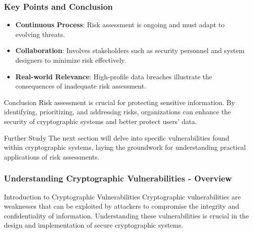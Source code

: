 \documentclass{beamer}
\begin{document}
\begin{frame}[fragile]
    \frametitle{Key Points and Conclusion}
    \begin{itemize}
        \item \textbf{Continuous Process}: Risk assessment is ongoing and must adapt to evolving threats.
        \item \textbf{Collaboration}: Involves stakeholders such as security personnel and system designers to minimize risk effectively.
        \item \textbf{Real-world Relevance}: High-profile data breaches illustrate the consequences of inadequate risk assessment.
    \end{itemize}
    
    \begin{block}{Conclusion}
        Risk assessment is crucial for protecting sensitive information. By identifying, prioritizing, and addressing risks, organizations can enhance the security of cryptographic systems and better protect users' data.
    \end{block}
    
    \begin{block}{Further Study}
        The next section will delve into specific vulnerabilities found within cryptographic systems, laying the groundwork for understanding practical applications of risk assessments.
    \end{block}
\end{frame}

\begin{frame}[fragile]
    \frametitle{Understanding Cryptographic Vulnerabilities - Overview}
    \begin{block}{Introduction to Cryptographic Vulnerabilities}
        Cryptographic vulnerabilities are weaknesses that can be exploited by attackers to compromise the integrity and confidentiality of information. 
        Understanding these vulnerabilities is crucial in the design and implementation of secure cryptographic systems.
    \end{block}
\end{frame}
\end{document}
